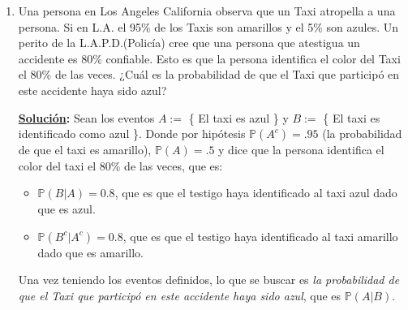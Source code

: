 \documentclass[11pt,letterpaper]{report}
\newcommand{\Pro}{\mathds{P}}
\newcommand{\sol}{\textbf{\underline{Solución}: }} %
\begin{document}
\begin{enumerate}
\begin{itemize}
    Regresadon al problema, lo que queremos obtener es $\Pro(A^c | V)$ que es,
    $\Pro(A^c | V) = 1 - \Pro(A | V) = 1 - 0.9 = 0.1$.

    Sustituyendo en $(2)$ tenemos que:
    \begin{align*}
        \Pro(A^c | F)
            &= \Pro(A^c | F) \cdot \Pro(F) + \Pro(A^c | V) \cdot \Pro(V)\\
            &= 0.9 \cdot 0.05 + 0.1 \cdot 0.95\\
            &= 0.14
    \end{align*}

    Sustituyendo en $(1)$ usando $(2)$, se tiene que:
    \begin{align*}
        \Pro(F | A^c)
            &= \frac{\Pro(A^c | F) \cdot \Pro(F)}{\Pro(A^c)}\\
            &= \frac{0.9 \cdot 0.05}{0.14}\\
            &\approx 0.3214
    \end{align*}
    
    Por tanto la probabilidad de que esta persona verdaderamente esté mintiendo es $\approx$ 0.3214.

    \item ¿Qué tan confiable debería ser la prueba del poligrafo para que la probabilidad de que una
    persona que verdaderamente esté mintiendo dado que la prueba del poligrafo resulto positiva sea
    de al menos 80\%?
    
    \sol 0.987
\end{itemize}

\item Una persona en Los Angeles California observa que un Taxi atropella a una persona. Si en L.A.
el 95\% de los Taxis son amarillos y el 5\% son azules. Un perito de la L.A.P.D.(Policía) cree que
una persona que atestigua un accidente es 80\% confiable. Esto es que la persona identifica el color
del Taxi el 80\% de las veces. ¿Cuál es la probabilidad de que el Taxi que participó en este
accidente haya sido azul?

\sol Sean los eventos $A :=$ \{ El taxi es azul \} y $B :=$ \{ El taxi es identificado como azul \}.
Donde por hipótesis $\Pro(A^c) = .95$ (la probabilidad de que el taxi es amarillo), $\Pro(A) = .5$
y dice que la persona identifica el color del taxi el 80\% de las veces, que es:
\begin{itemize}
    \item $\Pro(B | A) = 0.8$, que es que el testigo haya identificado al taxi azul dado que es azul.
    \item $\Pro(B^c | A^c) = 0.8$, que es que el testigo haya identificado al taxi amarillo dado que es amarillo.
\end{itemize}
Una vez teniendo los eventos definidos, lo que se buscar es \emph{la probabilidad de que el Taxi
que participó en este accidente haya sido azul}, que es $\Pro(A | B)$.


\end{enumerate}
\end{document}
